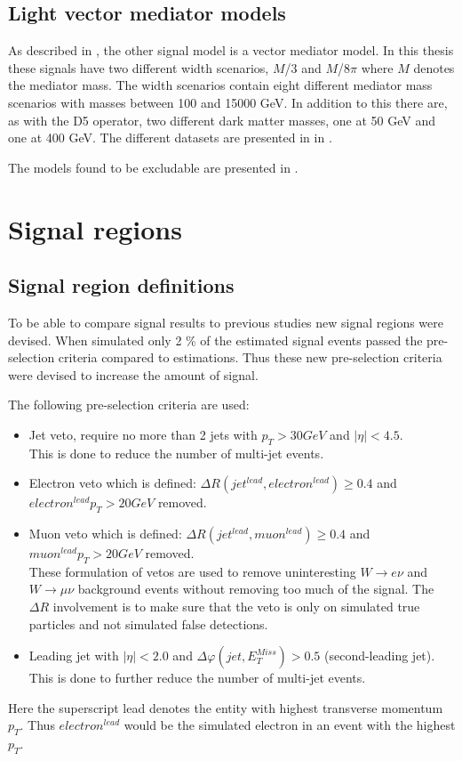 \subsection{Light vector mediator models}\label{sec:signal:subsec:vecmed}
As described in , the other signal model is a vector mediator model. In this thesis these signals have two different width scenarios, $M$/3 and $M$/8$\pi$ where $M$ denotes the mediator mass. The width scenarios contain eight different mediator mass scenarios with masses between 100 and 15000 GeV. In addition to this there are, as with the D5 operator, two different dark matter masses, one at 50 GeV and one at 400 GeV. The different datasets are presented in  in .

The models found to be excludable are presented in . 
\newpage
\section{Signal regions}
\subsection{Signal region definitions}\label{sec:sr:subsec:srd}
To be able to compare signal results to previous studies new signal regions were devised. When simulated only 2 \% of the estimated signal events passed the pre-selection criteria compared to estimations. Thus these new pre-selection criteria were devised to increase the amount of signal. 

The following pre-selection criteria are used:
\begin{itemize}
\item Jet veto, require no more than 2 jets with $p_T > 30 GeV$ and $|\eta| < 4.5$.  \\ 
This is done to reduce the number of multi-jet events.
\item Electron veto which is defined: $\Delta R (jet^{lead},electron^{lead})\geq 0.4$ and \\
$electron^{lead} p_T>20 GeV$ removed.
\item Muon veto which is defined: $\Delta R (jet^{lead},muon^{lead})\geq 0.4$ and \\
$muon^{lead} p_T>20 GeV$ removed. \\
These formulation of vetos are used to remove uninteresting $W \rightarrow e \nu$ and $W \rightarrow \mu \nu$ background events without removing too much of the signal. The $\Delta R$ involvement is to make sure that the veto is only on simulated true particles and not simulated false detections.
\item Leading jet with $|\eta| < 2.0$ and $\Delta \varphi (jet, E_T^{Miss})>0.5$ (second-leading jet).\\ 
This is done to further reduce the number of multi-jet events.
\end{itemize}
Here the superscript lead denotes the entity with highest transverse momentum $p_T$. Thus $electron^{lead}$ would be the simulated electron in an event with the highest $p_T$.

